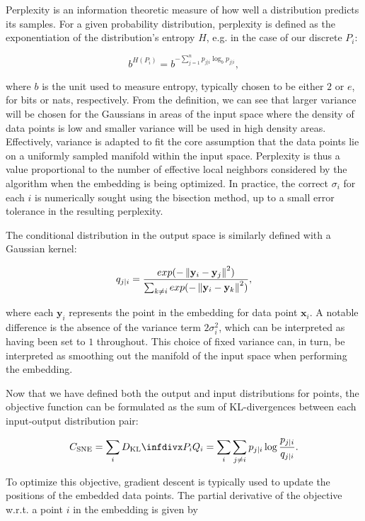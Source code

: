 Perplexity is an information theoretic measure of how well a distribution predicts its samples. For a given probability distribution, perplexity is defined as the exponentiation of the distribution's entropy $H$, e.g. in the case of our discrete $P_i$:

$$b^{H(P_i)} = b^{-\sum_{j=1}^{n} p_{j \vert i} \log_b p_{j \vert i}},$$

where $b$ is the unit used to measure entropy, typically chosen to be either $2$ or $e$, for bits or nats, respectively. From the definition, we can see that larger variance will be chosen for the Gaussians in areas of the input space where the density of data points is low and smaller variance will be used in high density areas. Effectively, variance is adapted to fit the core assumption that the data points lie on a uniformly sampled manifold within the input space. Perplexity is thus a value proportional to the number of effective local neighbors considered by the algorithm when the embedding is being optimized. In practice, the correct $\sigma_i$ for each $i$ is numerically sought using the bisection method, up to a small error tolerance in the resulting perplexity.

The conditional distribution in the output space is similarly defined with a Gaussian kernel:

$$q_{j \vert i} = \frac{exp(-\left\lVert\mathbf{y}_i - \mathbf{y}_j\right\rVert^2)}{\sum_{k \neq i} exp(-\left\lVert\mathbf{y}_i - \mathbf{y}_k\right\rVert^2)},$$

where each $\mathbf{y}_i$ represents the point in the embedding for data point $\mathbf{x}_i$. A notable difference is the absence of the variance term $2 \sigma_i^2$, which can be interpreted as having been set to $1$ throughout. This choice of fixed variance can, in turn, be interpreted as smoothing out the manifold of the input space when performing the embedding.

Now that we have defined both the output and input distributions for points, the objective function can be formulated as the sum of KL-divergences between each input-output distribution pair:

\begin{equation}
C_{\text{SNE}} = \sum_i \dkl{P_i}{Q_i} = \sum_i \sum_{j \neq i} p_{j \vert i} \log \frac{p_{j \vert i}}{q_{j \vert i}}.
\label{eq:c_sne}
\end{equation}

To optimize this objective, gradient descent is typically used to update the positions of the embedded data points. The partial derivative of the objective w.r.t. a point $i$ in the embedding is given by

